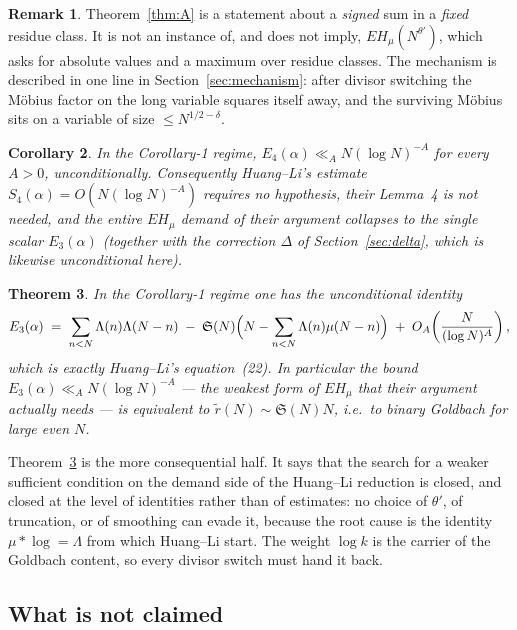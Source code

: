 \documentclass[11pt,a4paper]{article}
\theoremstyle{plain}
\newtheorem{theorem}{Theorem}
\newtheorem{corollary}[theorem]{Corollary}
\theoremstyle{definition}
\newtheorem{remark}[theorem]{Remark}
\renewcommand{\SS}{\mathfrak{S}}
\begin{document}
\begin{remark}
Theorem~\ref{thm:A} is a statement about a \emph{signed} sum in a
\emph{fixed} residue class. It is not an instance of, and does not
imply, $EH_\mu(N^{\theta'})$, which asks for absolute values and a
maximum over residue classes. The mechanism is described in one line in
Section~\ref{sec:mechanism}: after divisor switching the M\"obius factor
on the long variable squares itself away, and the surviving M\"obius
sits on a variable of size $\le N^{1/2-\delta}$.
\end{remark}

\begin{corollary}\label{cor:B}
In the Corollary-1 regime, $E_4(\alpha)\ll_A N(\log N)^{-A}$ for every
$A>0$, unconditionally. Consequently Huang--Li's estimate
$S_4(\alpha)=O(N(\log N)^{-A})$ requires no hypothesis, their Lemma~4 is
not needed, and the entire $EH_\mu$ demand of their argument collapses
to the single scalar $E_3(\alpha)$ (together with the correction
$\Delta$ of Section~\ref{sec:delta}, which is likewise unconditional
here).
\end{corollary}

\begin{theorem}\label{thm:C}
In the Corollary-1 regime one has the unconditional identity
\[
  E_3(\alpha) \;=\; \sum_{n<N}\Lambda(n)\Lambda(N-n)
     \;-\; \SS(N)\Bigl(N-\sum_{n<N}\Lambda(n)\mu(N-n)\Bigr)
     \;+\; O_A\!\left(\frac{N}{(\log N)^{A}}\right),
\]
which is exactly Huang--Li's equation~(22). In particular the bound
$E_3(\alpha)\ll_A N(\log N)^{-A}$ --- the weakest form of $EH_\mu$ that
their argument actually needs --- is \emph{equivalent} to
$\tilde r(N)\sim\SS(N)N$, i.e.\ to binary Goldbach for large even $N$.
\end{theorem}

Theorem~\ref{thm:C} is the more consequential half. It says that the
search for a weaker sufficient condition on the demand side of the
Huang--Li reduction is closed, and closed at the level of identities
rather than of estimates: no choice of $\theta'$, of truncation, or of
smoothing can evade it, because the root cause is the identity
$\mu*\log=\Lambda$ from which Huang--Li start. The weight $\log k$ is
the carrier of the Goldbach content, so every divisor switch must hand
it back.

\subsection{What is not claimed}\label{sec:notclaimed}
\end{document}

